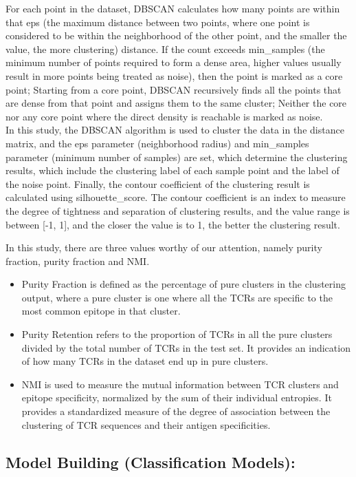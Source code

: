 \documentclass[conference]{IEEEtran}
\begin{document}
	For each point in the dataset, DBSCAN calculates how many points are within that eps (the maximum distance between two points, where one point is considered to be within the neighborhood of the other point, and the smaller the value, the more clustering) distance. If the count exceeds min\_samples (the minimum number of points required to form a dense area, higher values usually result in more points being treated as noise), then the point is marked as a core point; Starting from a core point, DBSCAN recursively finds all the points that are dense from that point and assigns them to the same cluster; Neither the core nor any core point where the direct density is reachable is marked as noise.
    \\
	
	In this study, the DBSCAN algorithm is used to cluster the data in the distance matrix, and the eps parameter (neighborhood radius) and min\_samples parameter (minimum number of samples) are set, which determine the clustering results, which include the clustering label of each sample point and the label of the noise point. Finally, the contour coefficient of the clustering result is calculated using silhouette\_score. The contour coefficient is an index to measure the degree of tightness and separation of clustering results, and the value range is between [-1, 1], and the closer the value is to 1, the better the clustering result.
	
	In this study, there are three values worthy of our attention, namely purity fraction, purity fraction and NMI\cite{b1}.
	\begin{itemize}
		\item Purity Fraction is defined as the percentage of pure clusters in the clustering output, where a pure cluster is one where all the TCRs are specific to the most common epitope in that cluster. 
		\item Purity Retention refers to the proportion of TCRs in all the pure clusters divided by the total number of TCRs in the test set. It provides an indication of how many TCRs in the dataset end up in pure clusters. 
		\item NMI is used to measure the mutual information between TCR clusters and epitope specificity, normalized by the sum of their individual entropies. It provides a standardized measure of the degree of association between the clustering of TCR sequences and their antigen specificities.
	\end{itemize}
 
	\subsection{Model Building (Classification Models):}
\end{document}
